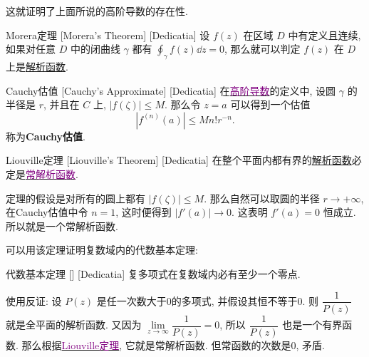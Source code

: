 \documentclass[UTF8]{ctexart}
\newcommand{\hyperrefc}[2]{\hyperref[#1]{\textcolor{purple}{#2}}}
\newcommand{\AnalyticalFunction}{\hyperref[dfn:AnalyticalFunction]{解析函数}}
\begin{document}
这就证明了上面所说的高阶导数的存在性. 
\begin{thm}
    [UUID]
    {Morera定理}
    [Morera's Theorem]
    [Dedicatia]
    设 \( f(z) \) 在区域 \( D \) 中有定义且连续, 如果对任意 \( D \) 中的闭曲线 \( \gamma \) 都有 \( \oint_\gamma f(z)\dd{z}=0 \), 那么就可以判定 \( f(z) \) 在 \( D \) 上是\AnalyticalFunction.
\end{thm}
\begin{dfn}
    [UUID]
    {Cauchy估值}
    [Cauchy's Approximate]
    [Dedicatia]
    在\hyperrefc{dfn:HighOrderedDerivative}{高阶导数}的定义中, 设圆 \( \gamma \) 的半径是 \( r \), 并且在 \( C \) 上,  \( |f(\zeta)|\leqslant M \). 那么令 \( z=a \) 可以得到一个估值
    \[|f^{(n)}(a)|\leqslant Mn!r^{-n}.\]
    称为\textbf{Cauchy估值}.
\end{dfn}
\begin{thm}
    [Liouville]
    {Liouville定理}
    [Liouville's Theorem]
    [Dedicatia]
    在整个平面内都有界的\AnalyticalFunction 必定是\hyperrefc{ppt:TrivialAnalyticalFunction}{常解析函数}. 
\end{thm}
\begin{prf}
    定理的假设是对所有的圆上都有 \( |f(\zeta)|\leqslant M \). 那么自然可以取圆的半径 \( r\to+\infty  \), 在Cauchy估值中令 \( n=1 \), 这时便得到 \( |f'(a)|\to 0 \). 这表明 \( f'(a)=0 \) 恒成立. 所以就是一个常解析函数. 
\end{prf}
可以用该定理证明复数域内的代数基本定理: 
\begin{thm}
    [UUID]
    {代数基本定理}
    []
    [Dedicatia]
    复多项式在复数域内必有至少一个零点. 
\end{thm}
\begin{prf}
    使用反证: 设 \( P(z) \) 是任一次数大于0的多项式, 并假设其恒不等于0. 则 \( \dfrac{1}{P(z)} \) 就是全平面的解析函数. 又因为 \( \lim\limits_{z\to\infty}\dfrac{1}{P(z)}=0 \), 所以 \( \dfrac{1}{P(z)} \) 也是一个有界函数. 那么根据\hyperrefc{thm:Liouville}{Liouville定理}, 它就是常解析函数. 但常函数的次数是0, 矛盾. 
\end{prf}
\end{document}
